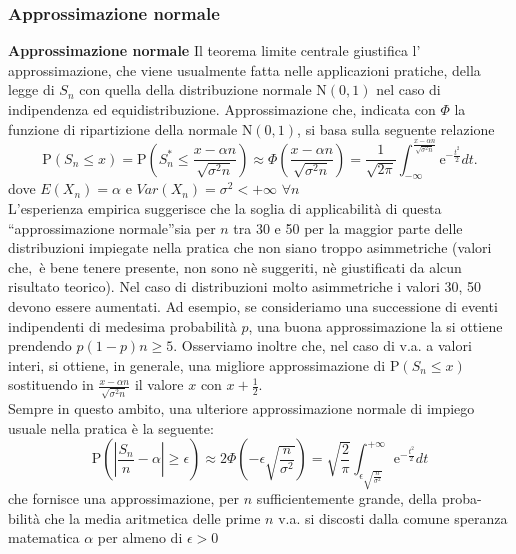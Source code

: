 \documentclass[a4paper,11pt]{article}
\theoremstyle{plain}
\theoremstyle{definition}
\theoremstyle{remark}
\begin{document}
\subsubsection{Approssimazione normale}
\noindent
\textbf{Approssimazione normale} Il teorema limite centrale giustifica l' approssimazione, che viene usualmente fatta nelle applicazioni pratiche, della legge di $S_{n}$ con quella della distribuzione normale $\mathrm{N}(0,1)$ nel caso di indipendenza ed equidistribuzione. Approssimazione $\mathrm{c}\mathrm{h}\mathrm{e}$, indicata con $\Phi$ la funzione di ripartizione della normale $\mathrm{N}(0,1)$, si basa sulla seguente relazione
$$
\mathrm{P}(S_{n}\leq x)=\mathrm{P}(S_{n}^{*}\leq\frac{x-\alpha n}{\sqrt{\sigma^{2}n}})\approx\Phi(\frac{x-\alpha n}{\sqrt{\sigma^{2}n}})=\frac{1}{\sqrt{2\pi}}\int_{-\infty}^{\frac{x-\alpha n}{\sqrt{\sigma^{2}n}}}\mathrm{e}^{-\frac{t^{2}}{2}}dt.
$$
dove $E(X_n)=\alpha$ e $Var(X_n)=\sigma^2 <+\infty$ $\forall n$\\

\noindent
L'esperienza empirica suggerisce che la soglia di applicabilità di questa ``approssimazione normale''sia per $n$ tra 30 e 50 per la maggior parte delle distribuzioni impiegate nella pratica che non siano troppo asimmetriche (valori $\mathrm{c}\mathrm{h}\mathrm{e},$ è bene tenere presente, non sono nè suggeriti, nè giustificati da alcun risultato teorico). Nel caso di distribuzioni molto asimmetriche $\mathrm{i}$ valori 30, 50 devono essere aumentati. Ad esempio, se consideriamo una successione di eventi indipendenti di medesima probabilità $p$, una buona approssimazione la si ottiene prendendo $p(1-p)n\geq 5$. Osserviamo inoltre $\mathrm{c}\mathrm{h}\mathrm{e}$, nel caso di v.a. a valori interi, si ottiene, in generale, una migliore approssimazione di $\mathrm{P}(S_{n}\leq x)$ sostituendo in $\displaystyle \frac{x-\alpha n}{\sqrt{\sigma^{2}n}}$ il valore $x$ con $x+\displaystyle \frac{1}{2}.$\\

\noindent
Sempre in questo ambito, una ulteriore approssimazione normale di impiego usuale nella pratica è la seguente:
$$
\mathrm{P}\left(\left|\frac{S_{n}}{n}-\alpha\right|\geq\epsilon\right)\approx 2\Phi\left(-\epsilon\sqrt{\frac{n}{\sigma^{2}}}\right)=\sqrt{\frac{2}{\pi}}\int_{\epsilon\sqrt{\frac{n}{\sigma^{2}}}}^{+\infty}\mathrm{e}^{-\frac{t^{2}}{2}}dt
$$
che fornisce una approssimazione, per $n$ sufficientemente grande, della proba- bilità che la media aritmetica delle prime $n$ v.a. si discosti dalla comune speranza matematica $\alpha$ per almeno di $\epsilon>0$
\end{document}

